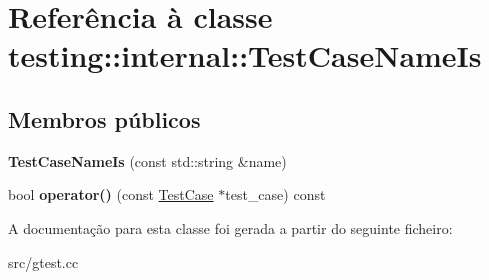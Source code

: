 \hypertarget{classtesting_1_1internal_1_1TestCaseNameIs}{\section{Referência à classe testing\-:\-:internal\-:\-:Test\-Case\-Name\-Is}
\label{classtesting_1_1internal_1_1TestCaseNameIs}
}
\subsection*{Membros públicos}
\begin{DoxyCompactItemize}
\item 
\hypertarget{classtesting_1_1internal_1_1TestCaseNameIs_a7c983707f4cfe7f36dbabc95da5113c4}{{\bfseries Test\-Case\-Name\-Is} (const std\-::string \&name)}\label{classtesting_1_1internal_1_1TestCaseNameIs_a7c983707f4cfe7f36dbabc95da5113c4}

\item 
\hypertarget{classtesting_1_1internal_1_1TestCaseNameIs_a6d6b1bf43aa7105aee9ef44edbc6d2e8}{bool {\bfseries operator()} (const \hyperlink{classtesting_1_1TestCase}{Test\-Case} $\ast$test\-\_\-case) const }\label{classtesting_1_1internal_1_1TestCaseNameIs_a6d6b1bf43aa7105aee9ef44edbc6d2e8}

\end{DoxyCompactItemize}


A documentação para esta classe foi gerada a partir do seguinte ficheiro\-:\begin{DoxyCompactItemize}
\item 
src/gtest.\-cc\end{DoxyCompactItemize}
